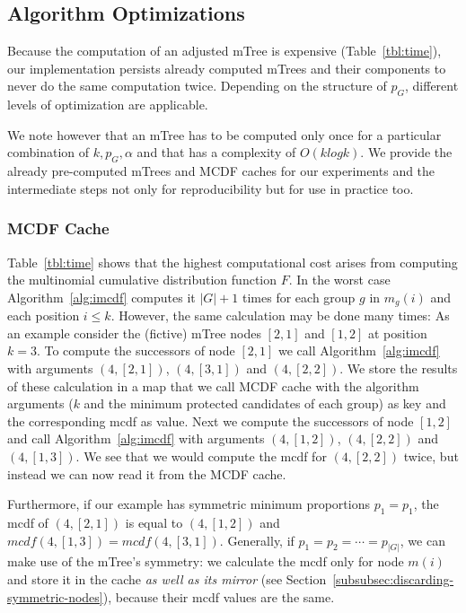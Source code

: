 \subsection{Algorithm Optimizations}
\label{subsec:algorithm-optimization}
Because the computation of an adjusted mTree is expensive (Table~\ref{tbl:time}), our implementation persists already computed mTrees and their components to never do the same computation twice. 
%
Depending on the structure of $p_G$, different levels of optimization are applicable.

We note however that an mTree has to be computed only once for a particular combination of $k, p_G, \alpha$ and that \algoFAIR has a complexity of $O(k log k)$.
%
We provide the already pre-computed mTrees and MCDF caches for our experiments and the intermediate steps not only for reproducibility but for use in practice too.

\subsubsection{MCDF Cache}\label{subsubsec:mcdf-cache}
Table~\ref{tbl:time} shows that the highest computational cost arises from computing the multinomial cumulative distribution function $F$. 
%
In the worst case Algorithm~\ref{alg:imcdf} computes it $|G|+1$ times for each group $g$ in $m_g(i)$ and each position $i\leq k$.
%
However, the same calculation may be done many times:
%
As an example consider the (fictive) mTree nodes $[2,1]$ and $[1,2]$ at position $k=3$. 
%
To compute the successors of node $[2,1]$ we call Algorithm~\ref{alg:imcdf} with arguments $(4,[2,1])$, $(4,[3,1])$ and $(4,[2,2])$. 
%
We store the results of these calculation in a map that we call MCDF cache with the algorithm arguments ($k$ and the minimum protected candidates of each group) as key and the corresponding mcdf as value.
%
Next we compute the successors of node $[1,2]$ and call Algorithm~\ref{alg:imcdf} with arguments $(4,[1,2])$, $(4,[2,2])$ and $(4,[1,3])$. 
%
We see that we would compute the mcdf for $(4,[2,2])$ twice, but instead we can now read it from the MCDF cache.

Furthermore, if our example has symmetric minimum proportions $p_1 = p_1$, the mcdf of $(4,[2,1])$ is equal to $(4,[1,2])$ and $\textit{mcdf}(4,[1,3]) = \textit{mcdf}(4,[3,1])$. 
%
Generally, if $p_1 = p_2 = \cdots = p_{|G|}$, we can make use of the mTree's symmetry: we calculate the mcdf only for node $m(i)$ and store it in the cache \emph{as well as its mirror} (see Section~\ref{subsubsec:discarding-symmetric-nodes}), because their mcdf values are the same.

